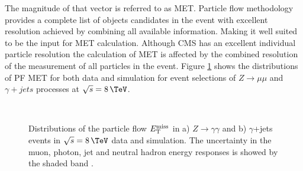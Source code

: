 The magnitude of that vector is referred to as \acrfull{MET}. Particle flow methodology provides a complete list of objects candidates in the event with excellent resolution achieved by combining all available information. Making it well suited to be the input for \gls{MET} calculation. Although \gls{CMS} has an excellent individual particle resolution the calculation of \gls{MET} is affected by the combined resolution of the measurement of all particles in the event. Figure \ref{FIGURE:EventReconstructionAndSimulation_METDistributionZmumu} shows the distributions of \gls{PF} \gls{MET} for both data and simulation for event selections of $Z \rightarrow \mu\mu$ and $\gamma +jets$ processes at $\sqrt{s}=8\,\TeV$. 

\begin{figure}[!htp]%
\centering
{}\qquad
{}\\
 \caption[Distributions of the particle flow $\MET$ in $Z\rightarrow\gamma\gamma$ and $\gamma$+jets events in $\sqrt{s}=8\,\TeV$ data and simulation.]{Distributions of the particle flow $\MET$ in a) $Z\rightarrow\gamma\gamma$ and b) $\gamma$+jets events in $\sqrt{s}=8\,\TeV$ data and simulation. The uncertainty in the muon, photon, jet and neutral hadron energy responses is showed by the shaded band \cite{ARTICLE:CMSMETPerformance8TeV}.}
\label{FIGURE:EventReconstructionAndSimulation_METDistributionZmumu}
\end{figure}

